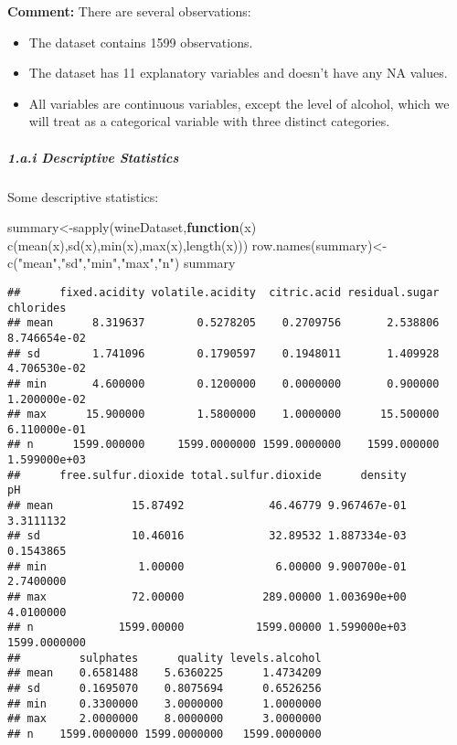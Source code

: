 \documentclass[
]{article}
\newenvironment{Shaded}{\begin{snugshade}}{\end{snugshade}}
\newcommand{\ControlFlowTok}[1]{\textcolor[rgb]{0.13,0.29,0.53}{\textbf{#1}}}
\newcommand{\FunctionTok}[1]{\textcolor[rgb]{0.00,0.00,0.00}{#1}}
\newcommand{\NormalTok}[1]{#1}
\newcommand{\OtherTok}[1]{\textcolor[rgb]{0.56,0.35,0.01}{#1}}
\newcommand{\StringTok}[1]{\textcolor[rgb]{0.31,0.60,0.02}{#1}}
\begin{document}
\textbf{Comment:} There are several observations:

\begin{itemize}
\item
  The dataset contains 1599 observations.
\item
  The dataset has 11 explanatory variables and doesn't have any NA
  values.
\item
  All variables are continuous variables, except the level of alcohol,
  which we will treat as a categorical variable with three distinct
  categories.
\end{itemize}

\hypertarget{a.i-descriptive-statistics}{%
\subparagraph{1.a.i Descriptive
Statistics}\label{a.i-descriptive-statistics}}

Some descriptive statistics:

\begin{Shaded}
\begin{Highlighting}[]
\NormalTok{summary}\OtherTok{\textless{}{-}}\FunctionTok{sapply}\NormalTok{(wineDataset,}\ControlFlowTok{function}\NormalTok{(x) }\FunctionTok{c}\NormalTok{(}\FunctionTok{mean}\NormalTok{(x),}\FunctionTok{sd}\NormalTok{(x),}\FunctionTok{min}\NormalTok{(x),}\FunctionTok{max}\NormalTok{(x),}\FunctionTok{length}\NormalTok{(x)))}
\FunctionTok{row.names}\NormalTok{(summary)}\OtherTok{\textless{}{-}}\FunctionTok{c}\NormalTok{(}\StringTok{"mean"}\NormalTok{,}\StringTok{"sd"}\NormalTok{,}\StringTok{"min"}\NormalTok{,}\StringTok{"max"}\NormalTok{,}\StringTok{"n"}\NormalTok{)}
\NormalTok{summary}
\end{Highlighting}
\end{Shaded}

\begin{verbatim}
##      fixed.acidity volatile.acidity  citric.acid residual.sugar    chlorides
## mean      8.319637        0.5278205    0.2709756       2.538806 8.746654e-02
## sd        1.741096        0.1790597    0.1948011       1.409928 4.706530e-02
## min       4.600000        0.1200000    0.0000000       0.900000 1.200000e-02
## max      15.900000        1.5800000    1.0000000      15.500000 6.110000e-01
## n      1599.000000     1599.0000000 1599.0000000    1599.000000 1.599000e+03
##      free.sulfur.dioxide total.sulfur.dioxide      density           pH
## mean            15.87492             46.46779 9.967467e-01    3.3111132
## sd              10.46016             32.89532 1.887334e-03    0.1543865
## min              1.00000              6.00000 9.900700e-01    2.7400000
## max             72.00000            289.00000 1.003690e+00    4.0100000
## n             1599.00000           1599.00000 1.599000e+03 1599.0000000
##         sulphates      quality levels.alcohol
## mean    0.6581488    5.6360225      1.4734209
## sd      0.1695070    0.8075694      0.6526256
## min     0.3300000    3.0000000      1.0000000
## max     2.0000000    8.0000000      3.0000000
## n    1599.0000000 1599.0000000   1599.0000000
\end{verbatim}
\end{document}
